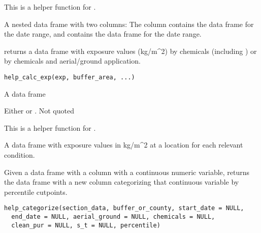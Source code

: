 \documentclass[a4paper]{book}
\begin{document}
%
\begin{Details}\relax
This is a helper function for .
\end{Details}
%
\begin{Value}
A nested data frame with two columns: The  column
contains the  data frame for the date range, and
 contains the  data frame for the date range.
\end{Value}
%
\begin{Description}\relax
{} returns a data frame with exposure values (kg/m\textasciicircum{}2) by
chemicals (including ) or by chemicals and aerial/ground
application.
\end{Description}
%
\begin{Usage}
\begin{verbatim}
help_calc_exp(exp, buffer_area, ...)
\end{verbatim}
\end{Usage}
%
\begin{Arguments}
\begin{ldescription}
\item[\code{exp}] A data frame

\item[\code{...}] Either  or . Not
quoted
\end{ldescription}
\end{Arguments}
%
\begin{Details}\relax
This is a helper function for .
\end{Details}
%
\begin{Value}
A data frame with exposure values in kg/m\textasciicircum{}2 at a location for each
relevant condition.
\end{Value}
%
\begin{Description}\relax
Given a data frame with a column with a continuous numeric variable,
 returns the data frame with a new column categorizing
that continuous variable by percentile cutpoints.
\end{Description}
%
\begin{Usage}
\begin{verbatim}
help_categorize(section_data, buffer_or_county, start_date = NULL,
  end_date = NULL, aerial_ground = NULL, chemicals = NULL,
  clean_pur = NULL, s_t = NULL, percentile)
\end{verbatim}
\end{Usage}
\end{document}
